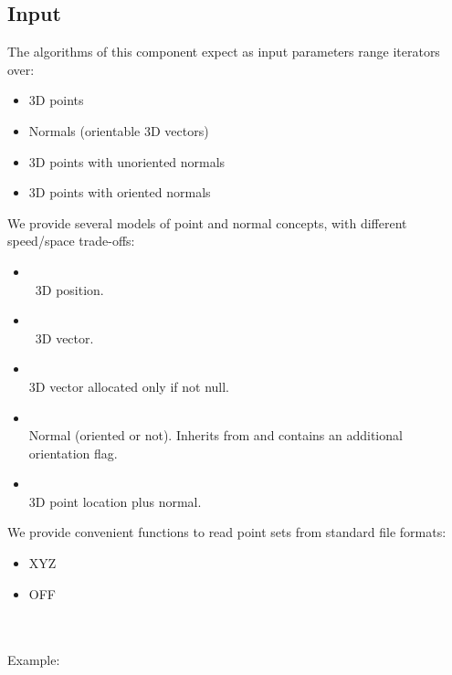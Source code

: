\subsection{Input}

The algorithms of this component expect as input parameters range iterators over:

\begin{itemize}
\item 3D points
\item Normals (orientable 3D vectors)
\item 3D points with unoriented normals
\item 3D points with oriented normals
\end{itemize}

We provide several models of point and normal concepts, with different speed/space trade-offs:

\begin{itemize}
\item {} \\
\cgal\ 3D position.
\item {} \\
\cgal\ 3D vector.
\item {} \\
3D vector allocated only if not null.
\item {} \\
Normal (oriented or not). Inherits from  and contains an additional orientation flag.
\item {} \\
3D point location plus normal.
\end{itemize}

We provide convenient functions to read point sets from standard file formats:

\begin{itemize}
\item XYZ
\item OFF
\end{itemize}

  \\
  \\

Example:


